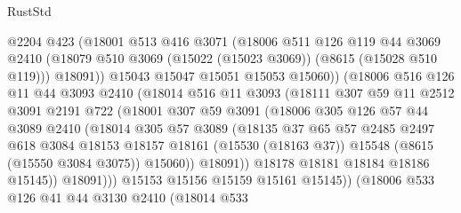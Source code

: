 \begin{lexlean}{RustStd}
\begin{coremodule}
                    @2204
                    @423
                    (@18001
                      @513
                      @416
                      @3071
                      (@18006
                        @511
                        @126
                        @119
                        @44
                        @3069
                        @2410
                        (@18079 @510 @3069 (@15022 (@15023 @3069)) (@8615 (@15028 @510 @119)))
                        @18091))
                    @15043
                    @15047
                    @15051
                    @15053
                    @15060))
                (@18006
                  @516
                  @126
                  @11
                  @44
                  @3093
                  @2410
                  (@18014
                    @516
                    @11
                    @3093
                    (@18111
                      @307
                      @59
                      @11
                      @2512
                      @3091
                      @2191
                      @722
                      (@18001
                        @307
                        @59
                        @3091
                        (@18006
                          @305
                          @126
                          @57
                          @44
                          @3089
                          @2410
                          (@18014
                            @305
                            @57
                            @3089
                            (@18135
                              @37
                              @65
                              @57
                              @2485
                              @2497
                              @618
                              @3084
                              @18153
                              @18157
                              @18161
                              (@15530 (@18163 @37))
                              @15548
                              (@8615 (@15550 @3084 @3075))
                              @15060))
                          @18091))
                      @18178
                      @18181
                      @18184
                      @18186
                      @15145))
                  @18091)))
            @15153
            @15156
            @15159
            @15161
            @15145))
        (@18006
          @533
          @126
          @41
          @44
          @3130
          @2410
          (@18014
            @533

\end{coremodule}
\end{lexlean}
